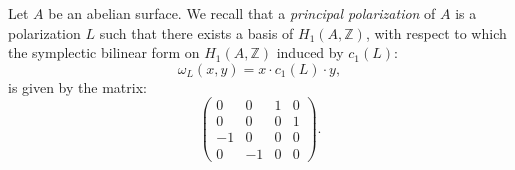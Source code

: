 \documentclass{alggeom}
\newcommand{\C}{\mathbb{C}}
\newcommand{\Z}{\mathbb{Z}}
\theoremstyle{plain}
\theoremstyle{definition}
\theoremstyle{remark}
\begin{document}



Let $A$ be an abelian surface. We recall that a \emph{principal polarization} of $A$ is a polarization $L$ such that there exists a basis of $H_1(A,\Z)$, with respect to which the symplectic bilinear form on $H_1(A,\Z)$ induced by $c_1(L)$:
\begin{equation}
\omega_L(x,y)=x\cdot c_1(L)\cdot y,
\label{symplecticprinc}
\end{equation}
is given by the matrix:
$$\left( {\begin{array}{cccc}
   0 & 0 & 1 & 0 \\    0 &  0 & 0 & 1\\ -1 & 0 & 0 & 0\\ 0 & -1 & 0 & 0     
   \end{array} } \right).$$
\end{document}

